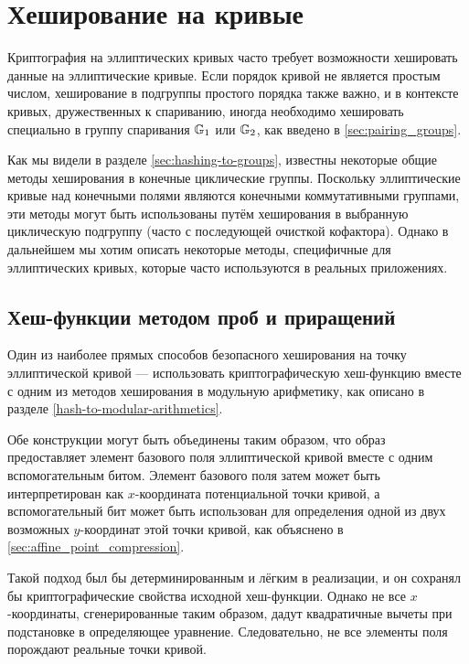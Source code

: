 
\section{Хеширование на кривые} Криптография на эллиптических кривых часто требует возможности хешировать данные на эллиптические кривые. Если порядок кривой не является простым числом, хеширование в подгруппы простого порядка также важно, и в контексте кривых, дружественных к спариванию, иногда необходимо хешировать специально в группу спаривания $\mathbb{G}_1$ или $\mathbb{G}_2$, как введено в \ref{sec:pairing_groups}.

Как мы видели в разделе \ref{sec:hashing-to-groups}, известны некоторые общие методы хеширования в конечные циклические группы. Поскольку эллиптические кривые над конечными полями являются конечными коммутативными группами, эти методы могут быть использованы путём хеширования в выбранную циклическую подгруппу (часто с последующей очисткой кофактора). Однако в дальнейшем мы хотим описать некоторые методы, специфичные для эллиптических кривых, которые часто используются в реальных приложениях. 

\subsection{Хеш-функции методом проб и приращений}
Один из наиболее прямых способов безопасного хеширования на точку эллиптической кривой — использовать криптографическую хеш-функцию вместе с одним из методов хеширования в модульную арифметику, как описано в разделе \ref{hash-to-modular-arithmetics}.

Обе конструкции могут быть объединены таким образом, что образ предоставляет элемент базового поля эллиптической кривой вместе с одним вспомогательным битом. Элемент базового поля затем может быть интерпретирован как $x$-координата потенциальной точки кривой, а вспомогательный бит может быть использован для определения одной из двух возможных $y$-координат этой точки кривой, как объяснено в \ref{sec:affine_point_compression}.

Такой подход был бы детерминированным и лёгким в реализации, и он сохранял бы криптографические свойства исходной хеш-функции. Однако не все $x$-координаты, сгенерированные таким образом, дадут квадратичные вычеты при подстановке в определяющее уравнение. Следовательно, не все элементы поля порождают реальные точки кривой. 

